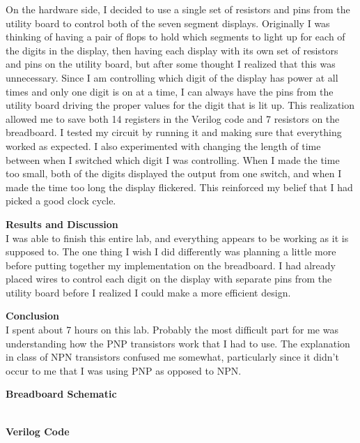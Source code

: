\documentclass[11pt,letterpaper]{article}
\begin{document}
On the hardware side, I decided to use a single set of resistors and pins from the utility board to control both of the seven segment displays. Originally I was thinking of having a pair of flops to hold which segments to light up for each of the digits in the display, then having each display with its own set of resistors and pins on the utility board, but after some thought I realized that this was unnecessary. Since I am controlling which digit of the display has power at all times and only one digit is on at a time, I can always have the pins from the utility board driving the proper values for the digit that is lit up. This realization allowed me to save both 14 registers in the Verilog code and 7 resistors on the breadboard. I tested my circuit by running it and making sure that everything worked as expected. I also experimented with changing the length of time between when I switched which digit I was controlling. When I made the time too small, both of the digits displayed the output from one switch, and when I made the time too long the display flickered. This reinforced my belief that I had picked a good clock cycle. 

\noindent\textbf{Results and Discussion}\\
I was able to finish this entire lab, and everything appears to be working as it is supposed to. The one thing I wish I did differently was planning a little more before putting together my implementation on the breadboard. I had already placed wires to control each digit on the display with separate pins from the utility board before I realized I could make a more efficient design.

\noindent\textbf{Conclusion}\\
I spent about 7 hours on this lab. Probably the most difficult part for me was understanding how the PNP transistors work that I had to use. The explanation in class of NPN transistors confused me somewhat, particularly since it didn't occur to me that I was using PNP as opposed to NPN.


\pagebreak

\noindent\textbf{Breadboard Schematic}\\\\


\pagebreak

\noindent\textbf{Verilog Code}\\
\lstset{language=Verilog}

\end{document}
